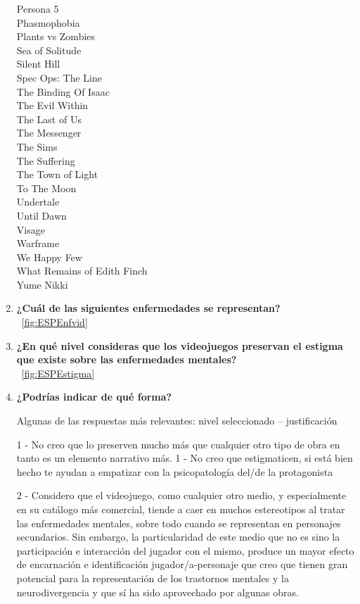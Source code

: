 \documentclass[12pt, a4paper,twoside,titlepage]{book}
\begin{document}
\begin{enumerate}[label=\textbf{\arabic*}.]
        Persona 5\\
        Phasmophobia\\
        Plants vs Zombies\\
        Sea of Solitude\\
        Silent Hill\\
        Spec Ops: The Line\\
        The Binding Of Isaac\\
        The Evil Within\\
        The Last of Us\\
        The Messenger\\
        The Sims\\
        The Suffering\\
        The Town of Light\\
        To The Moon\\
        Undertale\\
        Until Dawn\\
        Visage\\
        Warframe \\
        We Happy Few\\
        What Remains of Edith Finch\\
        Yume Nikki\\


     \item \textbf{¿Cuál de las siguientes enfermedades se representan? }\\
    ~\ref{fig:ESPEnfvid}
     \item \textbf{¿En qué nivel consideras que los videojuegos preservan el estigma que existe sobre las enfermedades mentales?}\\
    ~\ref{fig:ESPEstigma}
     \item \textbf{¿Podrías indicar de qué forma?}
    \label{estigmaCastellano}
    
    Algunas de las respuestas más relevantes: nivel seleccionado – justificación
        
    1 - No creo que lo preserven mucho más que cualquier otro tipo de obra en tanto es un elemento narrativo más.
    1 - No creo que estigmaticen, si está bien hecho te ayudan a empatizar con la psicopatología del/de la protagonista
    
    2 - Considero que el videojuego, como cualquier otro medio, y especialmente en su catálogo más comercial, tiende a caer en muchos estereotipos al tratar las enfermedades mentales, sobre todo cuando se representan en personajes secundarios. Sin embargo, la particularidad de este medio que no es sino la participación e interacción del jugador con el mismo, produce un mayor efecto de encarnación e identificación jugador/a-personaje que creo que tienen gran potencial para la representación de los trastornos mentales y la neurodivergencia y que sí ha sido aprovechado por algunas obras.
    

\end{enumerate}
\end{document}
